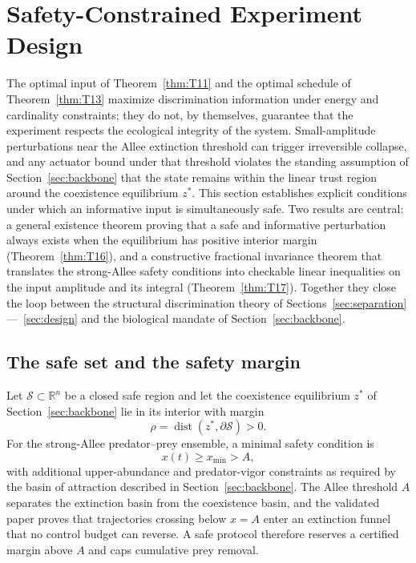 \section{Safety-Constrained Experiment Design}
\label{sec:safety}

The optimal input of Theorem~\ref{thm:T11} and the optimal schedule of Theorem~\ref{thm:T13} maximize discrimination information under energy and cardinality constraints; they do not, by themselves, guarantee that the experiment respects the ecological integrity of the system. Small-amplitude perturbations near the Allee extinction threshold can trigger irreversible collapse, and any actuator bound under that threshold violates the standing assumption of Section~\ref{sec:backbone} that the state remains within the linear trust region around the coexistence equilibrium \(z^*\). This section establishes explicit conditions under which an informative input is simultaneously safe. Two results are central: a general existence theorem proving that a safe and informative perturbation always exists when the equilibrium has positive interior margin (Theorem~\ref{thm:T16}), and a constructive fractional invariance theorem that translates the strong-Allee safety conditions into checkable linear inequalities on the input amplitude and its integral (Theorem~\ref{thm:T17}). Together they close the loop between the structural discrimination theory of Sections~\ref{sec:separation}---\ \ref{sec:design} and the biological mandate of Section~\ref{sec:backbone}.

\subsection{The safe set and the safety margin}

Let \(\mathcal{S} \subset \mathbb{R}^n\) be a closed safe region and let the coexistence equilibrium \(z^*\) of Section~\ref{sec:backbone} lie in its interior with margin
\begin{equation}
\rho = \operatorname{dist}(z^*, \partial \mathcal{S}) > 0.
\label{eq:rho_margin}
\end{equation}
For the strong-Allee predator--prey ensemble, a minimal safety condition is
\begin{equation}
x(t) \ge x_{\min} > A,
\label{eq:min_prey}
\end{equation}
with additional upper-abundance and predator-vigor constraints as required by the basin of attraction described in Section~\ref{sec:backbone}. The Allee threshold \(A\) separates the extinction basin from the coexistence basin, and the validated paper \citep{sasmal2018} proves that trajectories crossing below \(x=A\) enter an extinction funnel that no control budget can reverse. A safe protocol therefore reserves a certified margin above \(A\) and caps cumulative prey removal.

